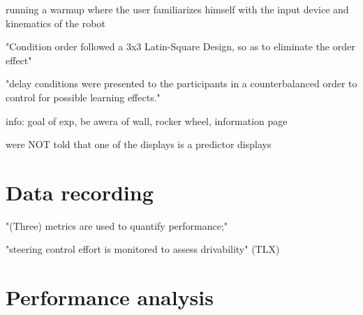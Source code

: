 running a warmup where the user familiarizes himself with the input device and kinematics of the robot

\citep{Lu2018} "Condition order followed a 3x3 Latin-Square Design, so as to eliminate the order effect"

"delay conditions were presented to the participants in a counterbalanced order to control for possible learning effects."

info: goal of exp, be awera of wall, rocker wheel, information page

were NOT told that one of the displays is a predictor displays


\section{Data recording}

"(Three) metrics are used to quantify performance;"

"steering control effort is monitored to assess drivability" (TLX)


\section{Performance analysis}
